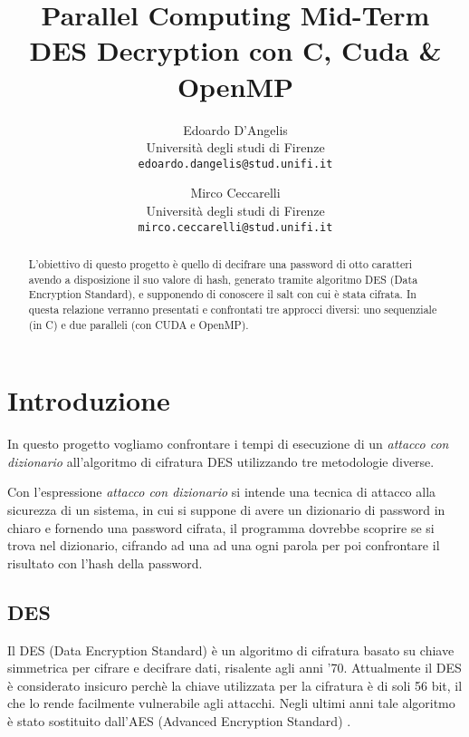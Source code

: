 \documentclass[10pt,twocolumn,letterpaper]{article}
\begin{document}
\title{Parallel Computing Mid-Term\\DES Decryption con C, Cuda \& OpenMP}

\author{Edoardo D'Angelis\\
Università degli studi di Firenze\\
{\tt\small edoardo.dangelis@stud.unifi.it}
\and
Mirco Ceccarelli\\
Università degli studi di Firenze\\
{\tt\small mirco.ceccarelli@stud.unifi.it}
}

\maketitle
\thispagestyle{empty}

\begin{abstract}
   L'obiettivo di questo progetto è quello di decifrare una password di otto caratteri avendo a disposizione il suo valore di hash, generato tramite algoritmo DES (Data Encryption Standard), e supponendo di conoscere il salt con cui è stata cifrata. In questa relazione verranno presentati e confrontati tre approcci diversi: uno sequenziale (in C) e due paralleli (con CUDA e OpenMP).
\end{abstract}

\section{Introduzione}
In questo progetto vogliamo confrontare i tempi di esecuzione di un \textit{attacco con dizionario} all'algoritmo di cifratura DES utilizzando tre metodologie diverse.

Con l'espressione \textit{attacco con dizionario} si intende una tecnica di attacco alla sicurezza di un sistema, in cui si suppone di avere un dizionario di password in chiaro e fornendo una password cifrata, il programma dovrebbe scoprire se si trova nel dizionario, cifrando ad una ad una ogni parola per poi confrontare il risultato con l'hash della password.

\subsection{DES}
Il DES (Data Encryption Standard) è un algoritmo di cifratura basato su chiave simmetrica per cifrare e decifrare dati, risalente agli anni '70. Attualmente il DES è considerato insicuro perchè la chiave utilizzata per la cifratura è di soli 56 bit, il che lo rende facilmente vulnerabile agli attacchi. Negli ultimi anni tale algoritmo è stato sostituito dall'AES (Advanced Encryption Standard) \cite{DES}. 
\end{document}
